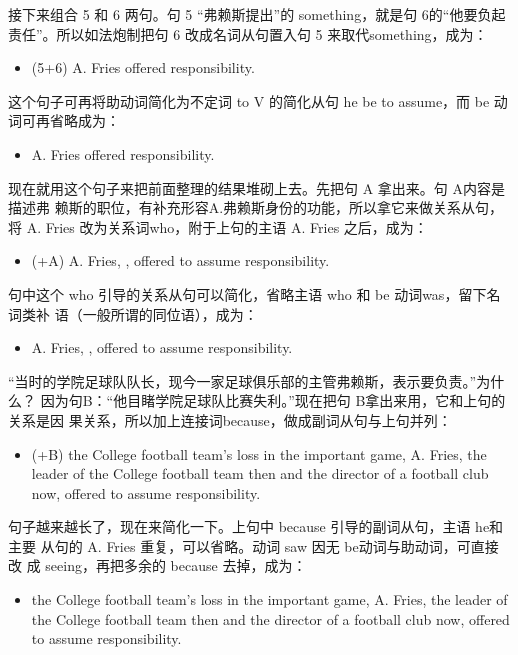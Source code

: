 接下来组合 5 和 6 两句。句 5 “弗赖斯提出”的 something，就是句 6的“他要负起
责任”。所以如法炮制把句 6 改成名词从句置入句 5 来取代something，成为：
\begin{itemize}
\item (5+6) A. Fries offered  responsibility.
\end{itemize}
这个句子可再将助动词简化为不定词 to V 的简化从句 he be to assume，而 be
动词可再省略成为：
\begin{itemize}
\item A. Fries offered  responsibility.
\end{itemize}

现在就用这个句子来把前面整理的结果堆砌上去。先把句 A 拿出来。句 A内容是描述弗
赖斯的职位，有补充形容A.弗赖斯身份的功能，所以拿它来做关系从句，将 A. Fries
改为关系词who，附于上句的主语 A. Fries 之后，成为：
\begin{itemize}
\item (+A) A. Fries, , offered to assume responsibility.
\end{itemize}
句中这个 who 引导的关系从句可以简化，省略主语 who 和 be 动词was，留下名词类补
语（一般所谓的同位语），成为：
\begin{itemize}
\item A. Fries, , offered to assume responsibility.
\end{itemize}
“当时的学院足球队队长，现今一家足球俱乐部的主管弗赖斯，表示要负责。”为什么？
因为句B：“他目睹学院足球队比赛失利。”现在把句 B拿出来用，它和上句的关系是因
果关系，所以加上连接词because，做成副词从句与上句并列：
\begin{itemize}
\item (+B)  the College football team's loss in the important
  game, A. Fries, the leader of the College football team then and the
  director of a football club now, offered to assume responsibility.
\end{itemize}
句子越来越长了，现在来简化一下。上句中 because 引导的副词从句，主语 he和主要
从句的 A. Fries 重复，可以省略。动词 saw 因无 be动词与助动词，可直接改
成 seeing，再把多余的 because 去掉，成为：
\begin{itemize}
\item {} the College football team's loss in the important game, A. Fries,
  the leader of the College football team then and the director of a
  football club now, offered to assume responsibility.
\end{itemize}

